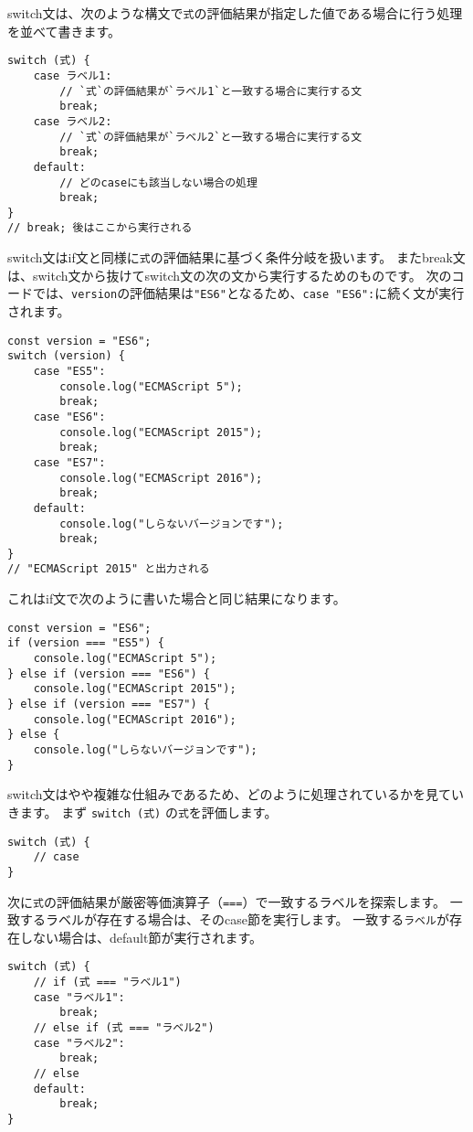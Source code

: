 switch文は、次のような構文で\texttt{式}の評価結果が指定した値である場合に行う処理を並べて書きます。

\begin{lstlisting}
switch (式) {
    case ラベル1:
        // `式`の評価結果が`ラベル1`と一致する場合に実行する文
        break;
    case ラベル2:
        // `式`の評価結果が`ラベル2`と一致する場合に実行する文
        break;
    default:
        // どのcaseにも該当しない場合の処理
        break;
}
// break; 後はここから実行される
\end{lstlisting}

switch文はif文と同様に\texttt{式}の評価結果に基づく条件分岐を扱います。
またbreak文は、switch文から抜けてswitch文の次の文から実行するためのものです。
次のコードでは、\texttt{version}の評価結果は\texttt{"ES6"}となるため、\texttt{case "ES6":}に続く文が実行されます。

\begin{lstlisting}
const version = "ES6";
switch (version) {
    case "ES5":
        console.log("ECMAScript 5");
        break;
    case "ES6":
        console.log("ECMAScript 2015");
        break;
    case "ES7":
        console.log("ECMAScript 2016");
        break;
    default:
        console.log("しらないバージョンです");
        break;
}
// "ECMAScript 2015" と出力される
\end{lstlisting}

これはif文で次のように書いた場合と同じ結果になります。

\begin{lstlisting}
const version = "ES6";
if (version === "ES5") {
    console.log("ECMAScript 5");
} else if (version === "ES6") {
    console.log("ECMAScript 2015");
} else if (version === "ES7") {
    console.log("ECMAScript 2016");
} else {
    console.log("しらないバージョンです");
}
\end{lstlisting}

switch文はやや複雑な仕組みであるため、どのように処理されているかを見ていきます。
まず \texttt{switch (式)}
の\texttt{式}を評価します。

\begin{lstlisting}
switch (式) {
    // case
}
\end{lstlisting}

次に\texttt{式}の評価結果が厳密等価演算子（\texttt{===}）で一致するラベルを探索します。
一致するラベルが存在する場合は、そのcase節を実行します。
一致する\texttt{ラベル}が存在しない場合は、default節が実行されます。

\begin{lstlisting}
switch (式) {
    // if (式 === "ラベル1")
    case "ラベル1":
        break;
    // else if (式 === "ラベル2")
    case "ラベル2":
        break;
    // else
    default:
        break;
}
\end{lstlisting}

